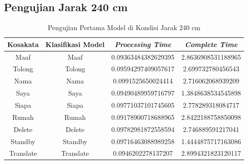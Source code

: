 \subsection{Pengujian Jarak 240 cm}
\label{sec:analisisjarak2}

\begin{longtable}{|c|c|c|c|}
  \caption{Pengujian Pertama Model di Kondisi Jarak 240 cm}
  \label{tb:prediksitengah1}                                   \\
  \hline
  \rowcolor[HTML]{C0C0C0}
  \textbf{Kosakata} & \textbf{Klasifikasi Model} & \textbf{\emph{Processing Time}} & \textbf{\emph{Complete Time}}\\
  \hline
  Maaf              & Maaf                        & 0.09363484382629395                           & 2.8636908531188965                                  \\
  Tolong            & Tolong                        & 0.09594297409057617                           & 2.699732780456543                                  \\
  Nama              & Nama                        & 0.0991525650024414                           & 2.716062068939209                                  \\
  Saya              & Saya                        & 0.09490489959716797                           & 1.3848638534545898                                  \\
  Siapa              & Siapa                        & 0.09771037101745605                           & 2.778289318084717                                  \\
  Rumah             & Rumah                        & 0.09178900718688965                           & 2.8422188758850098                                  \\
  Delete            & Delete                        & 0.09782981872558594                           & 2.746889591217041                                  \\
  Standby           & Standby                        & 0.09716463088989258                           & 1.4444875717163086                                  \\
  Translate         & Translate                        & 0.0946202278137207                           & 2.8994321823120117                                  \\
  \hline
\end{longtable}

